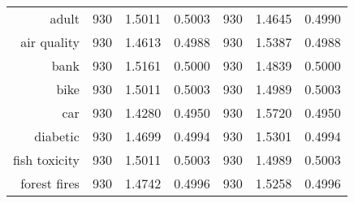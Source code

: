 \begin{table}[H]
{\begin{tabular}{rcccccc}
			adult                              & 930                                             & 1.5011                                                                             & 0.5003          & 930                               & \cellcolor[rgb]{ .776,  .937,  .808}\textcolor[rgb]{ 0,  .38,  0}{1.4645} & 0.4990          \\
			air quality                        & 930                                             & \cellcolor[rgb]{ .776,  .937,  .808}\textcolor[rgb]{ 0,  .38,  0}{1.4613}          & 0.4988          & 930                               & 1.5387                                                                    & 0.4988          \\
			bank                               & 930                                             & 1.5161                                                                             & 0.5000          & 930                               & \cellcolor[rgb]{ .776,  .937,  .808}\textcolor[rgb]{ 0,  .38,  0}{1.4839} & 0.5000          \\
			bike                               & 930                                             & 1.5011                                                                             & 0.5003          & 930                               & \cellcolor[rgb]{ .776,  .937,  .808}\textcolor[rgb]{ 0,  .38,  0}{1.4989} & 0.5003          \\
			car                                & 930                                             & \cellcolor[rgb]{ .776,  .937,  .808}\textcolor[rgb]{ 0,  .38,  0}{1.4280}          & 0.4950          & 930                               & 1.5720                                                                    & 0.4950          \\
			diabetic                           & 930                                             & \cellcolor[rgb]{ .776,  .937,  .808}\textcolor[rgb]{ 0,  .38,  0}{1.4699}          & 0.4994          & 930                               & 1.5301                                                                    & 0.4994          \\
			fish toxicity                      & 930                                             & 1.5011                                                                             & 0.5003          & 930                               & \cellcolor[rgb]{ .776,  .937,  .808}\textcolor[rgb]{ 0,  .38,  0}{1.4989} & 0.5003          \\
			forest fires                       & 930                                             & \cellcolor[rgb]{ .776,  .937,  .808}\textcolor[rgb]{ 0,  .38,  0}{1.4742}          & 0.4996          & 930                               & 1.5258                                                                    & 0.4996          \\

\end{tabular}}
\end{table}
